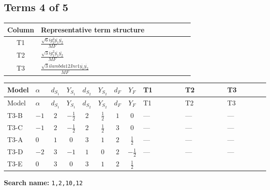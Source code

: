 \documentclass[8pt]{article}
\begin{document}
\begin{landscape}
\subsection*{Terms 4 of 5}
\begin{center}
\begin{tabular}{@{}c >{\raggedright\arraybackslash}p{0.82\linewidth}@{}}
\toprule
Column & Representative term structure \\
\midrule
T1 & \(\displaystyle \frac{\sqrt{6} i g_{2}^{2} \overline{y_{1}} \overline{y_{2}}}{MF}\) \\
\midrule
T2 & \(\displaystyle \frac{\sqrt{3} i g_{1}^{2} \overline{y_{1}} \overline{y_{2}}}{MF}\) \\
\midrule
T3 & \(\displaystyle \frac{\sqrt{3} i lambda12Inv1 \overline{y_{1}} \overline{y_{2}}}{MF}\) \\
\midrule
\bottomrule
\end{tabular}
\end{center}
\smallskip
\tiny
\begin{longtable}{@{}llcccccc >{\raggedright\arraybackslash}p{0.21\linewidth} >{\raggedright\arraybackslash}p{0.21\linewidth} >{\raggedright\arraybackslash}p{0.21\linewidth}@{}}
\toprule
Model & $\alpha$ & $d_{S_1}$ & $Y_{S_1}$ & $d_{S_2}$ & $Y_{S_2}$ & $d_F$ & $Y_F$ & T1 & T2 & T3 \\
\midrule
\endfirsthead
\toprule
Model & $\alpha$ & $d_{S_1}$ & $Y_{S_1}$ & $d_{S_2}$ & $Y_{S_2}$ & $d_F$ & $Y_F$ & T1 & T2 & T3 \\
\midrule
\endhead
T3-B & $-1$ & $2$ & $-\frac{1}{2}$ & $2$ & $\frac{1}{2}$ & $1$ & $0$ & --- & --- & --- \\
\midrule
T3-C & $-1$ & $2$ & $-\frac{1}{2}$ & $2$ & $\frac{1}{2}$ & $3$ & $0$ & --- & --- & --- \\
\midrule
T3-A & $0$ & $1$ & $0$ & $3$ & $1$ & $2$ & $\frac{1}{2}$ & --- & --- & --- \\
\midrule
T3-D & $-2$ & $3$ & $-1$ & $1$ & $0$ & $2$ & $-\frac{1}{2}$ & --- & --- & --- \\
\midrule
T3-E & $0$ & $3$ & $0$ & $3$ & $1$ & $2$ & $\frac{1}{2}$ & \scriptsize\adjustbox{max width=\linewidth}{$\begin{gathered} - \frac{\sqrt{6} i g_{2}^{2} \overline{y_{1}} \overline{y_{2}}}{6 MF}\end{gathered}$} & \scriptsize\adjustbox{max width=\linewidth}{$\begin{gathered} - \frac{\sqrt{3} i g_{1}^{2} \overline{y_{1}} \overline{y_{2}}}{8 MF}\end{gathered}$} & \scriptsize\adjustbox{max width=\linewidth}{$\begin{gathered} \frac{\sqrt{3} i lambda12Inv1 \overline{y_{1}} \overline{y_{2}}}{6 MF}\end{gathered}$} \\
\midrule
\bottomrule
\end{longtable}
\clearpage
\noindent\textbf{Search name: }\texttt{1,2,10,12}\par\smallskip

\end{landscape}
\end{document}

